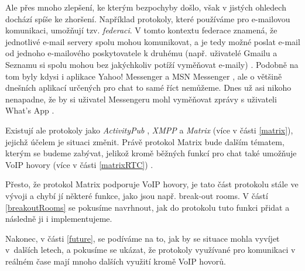 Ale přes mnoho zlepšení, ke kterým bezpochyby došlo, však v jistých ohledech
dochází spíše ke zhoršení. Například protokoly, které používáme pro e-mailovou
komunikaci, umožňují tzv. \textit{federaci}. V tomto kontextu federace znamená,
že jednotlivé e-mail servery spolu mohou komunikovat, a je tedy možné poslat
e-mail od jednoho e-mailového poskytovatele k druhému (např. uživatelé Gmailu a
Seznamu si spolu mohou bez jakýchkoliv potíží vyměňovat e-maily)
\cite{MatrixORG-FAQ}. Podobně na tom byly kdysi i aplikace Yahoo! Messenger a
MSN Messenger \cite{BetaNews-MSYahooToLinkIMNets}, ale o většině dnešních
aplikací určených pro chat to samé říct nemůžeme. Dnes už asi nikoho nenapadne,
že by si uživatel Messengeru mohl vyměňovat zprávy s uživateli What's App
\cite{9To5Mac-InteroperabilityNightmareAndDream}.

Existují ale protokoly jako \textit{ActivityPub} \cite{W3ORG-ActivityPub},
\textit{XMPP} \cite{XMPPORG-Homepage} a \textit{Matrix}
\cite{MatrixORG-Homepage} (více v části \ref{matrix}), jejichž účelem je situaci
změnit. Právě protokol Matrix bude dalším tématem, kterým se budeme zabývat,
jelikož kromě běžných funkcí pro chat také umožňuje VoIP hovory (více v části
\ref{matrixRTC}) \cite{MatrixORG-Homepage}.

Přesto, že protokol Matrix podporuje VoIP hovory, je tato část protokolu stále
ve vývoji \cite{GitHub-MSC3401,GitHub-MSC3898} a chybí jí některé funkce, jako
jsou např. break-out rooms. V částí \ref{breakoutRooms} se pokusíme navrhnout,
jak do protokolu tuto funkci přidat a následně ji i implementujeme.

Nakonec, v části \ref{future}, se podíváme na to, jak by se situace mohla
vyvíjet v~dalších letech, a pokusíme se ukázat, že protokoly využívané pro
komunikaci v reálném čase mají mnoho dalších využití kromě VoIP hovorů.
